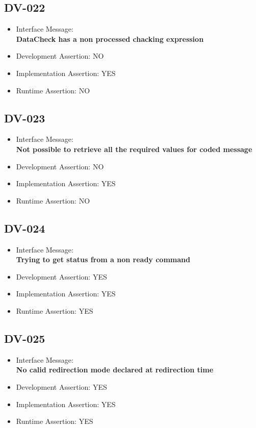 \subsection{DV-022}
\begin{itemize}
  \item Interface Message:\\[1em]
    \textbf{DataCheck has a non processed chacking expression}
  \item Development Assertion: NO
  \item Implementation Assertion: YES
  \item Runtime Assertion: NO
\end{itemize}

\subsection{DV-023}
\begin{itemize}
  \item Interface Message:\\[1em]
    \textbf{Not possible to retrieve all the required values for coded message}
  \item Development Assertion: NO
  \item Implementation Assertion: YES
  \item Runtime Assertion: NO
\end{itemize}

\subsection{DV-024}
\begin{itemize}
  \item Interface Message:\\[1em]
    \textbf{Trying to get status from a non ready command}
  \item Development Assertion: YES
  \item Implementation Assertion: YES
  \item Runtime Assertion: YES
\end{itemize}

\subsection{DV-025}
\begin{itemize}
  \item Interface Message:\\[1em]
    \textbf{No calid redirection mode declared at redirection time}
  \item Development Assertion: YES
  \item Implementation Assertion: YES
  \item Runtime Assertion: YES
\end{itemize}


